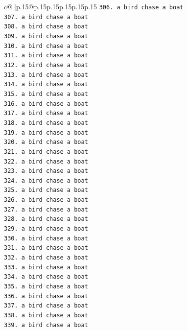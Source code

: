 \documentclass{article}
\begin{document}
{\begin{supertabular}{c@{$\;$}|p{.15\linewidth}@{}p{.15\linewidth}p{.15\linewidth}p{.15\linewidth}p{.15\linewidth}p{.15\linewidth}}
{{{\texttt{306. a bird chase a boat} \\
\texttt{307. a bird chase a boat} \\
\texttt{308. a bird chase a boat} \\
\texttt{309. a bird chase a boat} \\
\texttt{310. a bird chase a boat} \\
\texttt{311. a bird chase a boat} \\
\texttt{312. a bird chase a boat} \\
\texttt{313. a bird chase a boat} \\
\texttt{314. a bird chase a boat} \\
\texttt{315. a bird chase a boat} \\
\texttt{316. a bird chase a boat} \\
\texttt{317. a bird chase a boat} \\
\texttt{318. a bird chase a boat} \\
\texttt{319. a bird chase a boat} \\
\texttt{320. a bird chase a boat} \\
\texttt{321. a bird chase a boat} \\
\texttt{322. a bird chase a boat} \\
\texttt{323. a bird chase a boat} \\
\texttt{324. a bird chase a boat} \\
\texttt{325. a bird chase a boat} \\
\texttt{326. a bird chase a boat} \\
\texttt{327. a bird chase a boat} \\
\texttt{328. a bird chase a boat} \\
\texttt{329. a bird chase a boat} \\
\texttt{330. a bird chase a boat} \\
\texttt{331. a bird chase a boat} \\
\texttt{332. a bird chase a boat} \\
\texttt{333. a bird chase a boat} \\
\texttt{334. a bird chase a boat} \\
\texttt{335. a bird chase a boat} \\
\texttt{336. a bird chase a boat} \\
\texttt{337. a bird chase a boat} \\
\texttt{338. a bird chase a boat} \\
\texttt{339. a bird chase a boat} \\
}}}
\end{supertabular}}
\end{document}
